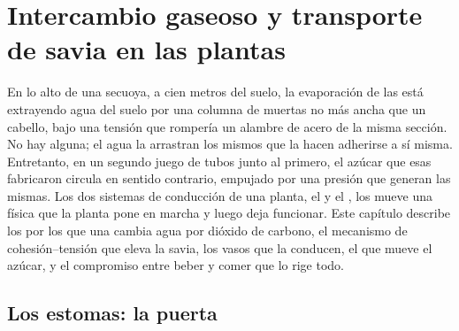 \chapter{Intercambio gaseoso y transporte de savia en las plantas}\label{ch:b1:plant-transport}

En lo alto de una secuoya, a cien metros del suelo, la evaporación de las
 está extrayendo agua del suelo por una columna de  muertas no
más ancha que un cabello, bajo una tensión que rompería un alambre de acero
de la misma sección. No hay  alguna; el agua la arrastran los mismos
 que la hacen adherirse a sí misma. Entretanto, en un
segundo juego de tubos junto al primero, el azúcar que esas 
fabricaron circula en sentido contrario, empujado por una presión que
generan las  mismas. Los dos sistemas de conducción de una planta, el
 y el , los mueve una física que la planta pone en marcha y
luego deja funcionar. Este capítulo describe los  por los que una
 cambia agua por dióxido de carbono, el mecanismo de cohesión--tensión
que eleva la savia, los vasos que la conducen, el  que mueve el azúcar, y el compromiso entre beber y comer que lo rige
todo.

\section{Los estomas: la puerta}

